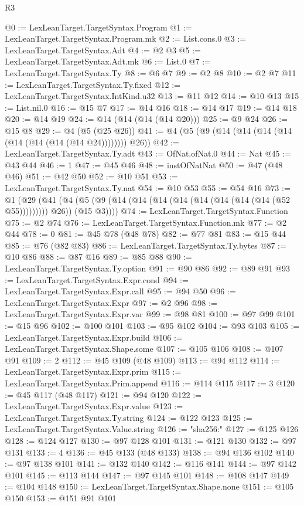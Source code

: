 \begin{lexlean}{R3}
\begin{coremodule}
@0 := LexLeanTarget.TargetSyntax.Program
@1 := LexLeanTarget.TargetSyntax.Program.mk
@2 := List.cons.{0}
@3 := LexLeanTarget.TargetSyntax.Adt
@4 := @2 @3
@5 := LexLeanTarget.TargetSyntax.Adt.mk
@6 := List.{0}
@7 := LexLeanTarget.TargetSyntax.Ty
@8 := @6 @7
@9 := @2 @8
@10 := @2 @7
@11 := LexLeanTarget.TargetSyntax.Ty.fixed
@12 := LexLeanTarget.TargetSyntax.IntKind.u32
@13 := @11 @12
@14 := @10 @13
@15 := List.nil.{0}
@16 := @15 @7
@17 := @14 @16
@18 := @14 @17
@19 := @14 @18
@20 := @14 @19
@24 := @14 (@14 (@14 (@14 @20)))
@25 := @9 @24
@26 := @15 @8
@29 := @4 (@5 (@25 @26))
@41 := @4 (@5 (@9 (@14 (@14 (@14 (@14 (@14 (@14 (@14 (@14 @24)))))))) @26))
@42 := LexLeanTarget.TargetSyntax.Ty.adt
@43 := OfNat.ofNat.{0}
@44 := Nat
@45 := @43 @44
@46 := 1
@47 := @45 @46
@48 := instOfNatNat
@50 := @47 (@48 @46)
@51 := @42 @50
@52 := @10 @51
@53 := LexLeanTarget.TargetSyntax.Ty.nat
@54 := @10 @53
@55 := @54 @16
@73 := @1
    (@29
      (@41 (@4 (@5 (@9 (@14 (@14 (@14 (@14 (@14 (@14 (@14 (@14 (@52 @55))))))))) @26)) (@15 @3))))
@74 := LexLeanTarget.TargetSyntax.Function
@75 := @2 @74
@76 := LexLeanTarget.TargetSyntax.Function.mk
@77 := @2 @44
@78 := 0
@81 := @45 @78 (@48 @78)
@82 := @77 @81
@83 := @15 @44
@85 := @76 (@82 @83)
@86 := LexLeanTarget.TargetSyntax.Ty.bytes
@87 := @10 @86
@88 := @87 @16
@89 := @85 @88
@90 := LexLeanTarget.TargetSyntax.Ty.option
@91 := @90 @86
@92 := @89 @91
@93 := LexLeanTarget.TargetSyntax.Expr.cond
@94 := LexLeanTarget.TargetSyntax.Expr.call
@95 := @94 @50
@96 := LexLeanTarget.TargetSyntax.Expr
@97 := @2 @96
@98 := LexLeanTarget.TargetSyntax.Expr.var
@99 := @98 @81
@100 := @97 @99
@101 := @15 @96
@102 := @100 @101
@103 := @95 @102
@104 := @93 @103
@105 := LexLeanTarget.TargetSyntax.Expr.build
@106 := LexLeanTarget.TargetSyntax.Shape.some
@107 := @105 @106
@108 := @107 @91
@109 := 2
@112 := @45 @109 (@48 @109)
@113 := @94 @112
@114 := LexLeanTarget.TargetSyntax.Expr.prim
@115 := LexLeanTarget.TargetSyntax.Prim.append
@116 := @114 @115
@117 := 3
@120 := @45 @117 (@48 @117)
@121 := @94 @120
@122 := LexLeanTarget.TargetSyntax.Expr.value
@123 := LexLeanTarget.TargetSyntax.Ty.string
@124 := @122 @123
@125 := LexLeanTarget.TargetSyntax.Value.string
@126 := "sha256:"
@127 := @125 @126
@128 := @124 @127
@130 := @97 @128 @101
@131 := @121 @130
@132 := @97 @131
@133 := 4
@136 := @45 @133 (@48 @133)
@138 := @94 @136 @102
@140 := @97 @138 @101
@141 := @132 @140
@142 := @116 @141
@144 := @97 @142 @101
@145 := @113 @144
@147 := @97 @145 @101
@148 := @108 @147
@149 := @104 @148
@150 := LexLeanTarget.TargetSyntax.Shape.none
@151 := @105 @150
@153 := @151 @91 @101

\end{coremodule}
\end{lexlean}
